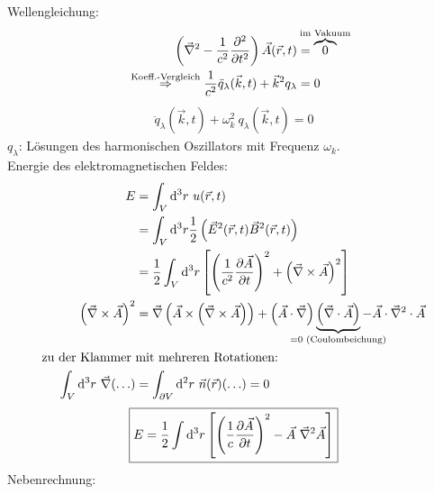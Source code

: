 	Wellengleichung: 
		\begin{align*}
			\left(
				\vec{\nabla}^2 - \frac{1}{c^2} \frac{\partial^2}{\partial t^2} 
			\right)
			\vec{A} (\vec{r} , t) &= \overbrace{0}^{\mathclap{\text{im Vakuum}}} \\
			\overset{\text{Koeff.-Vergleich}}{\Rightarrow} 
			\frac{1}{c^2} \ddot{q}_\lambda (\vec{k} , t) + \vec{k}^2 q_\lambda &= 0
		\end{align*}
		\begin{align*}
			\boxed{\ddot{q}_\lambda (\vec{k} , t) + \omega_k^2 ~q_\lambda (\vec{k} , t)} = 0
		\end{align*}
	$q_\lambda$: Lösungen des harmonischen Oszillators mit Frequenz $\omega_k$. \\
	Energie des elektromagnetischen Feldes: 
		\begin{align*}
			E &= \int_V \diff^3 r ~u (\vec{r} , t) \\
			&= \int_V \diff^3 r \frac{1}{2} \left( \vec{E}^2 (\vec{r} , t) \vec{B}^2 (\vec{r} , t)
			\right) \\
			&= \frac{1}{2} \int_V \diff^3 r \left[
				\left(\frac{1}{c^2} \frac{\partial \vec{A}}{\partial t}\right)^2
				+ \left( \vec{\nabla} \times \vec{A}\right)^2
			\right] \\
			\left( \vec{\nabla} \times \vec{A}\right)^2 &=
			\vec{\nabla} \left(\vec{A} \times \left( \vec{\nabla} \times \vec{A} \right)\right)
			+ \left(\vec{A} \cdot \vec{\nabla}\right) 
			\underbrace{\left( \vec{\nabla} \cdot \vec{A}\right)}_{\mathclap{=0 \text{~(Coulombeichung)}}}
			- \vec{A} \cdot \vec{\nabla}^2 \cdot \vec{A} \\
			\text{zu der Klammer~} &\text{mit mehreren Rotationen:~} \\
			\int_V \diff^3 r~ \vec{\nabla} (\ldots) 
			&= \int_{\partial V} \diff^2 r~ \vec{n} (\vec{r}) (\ldots) = 0
		\end{align*}
		\begin{align*}
			\boxed{
				E = \frac{1}{2} \int \mathrm{d}^3 r \left[ 
				\left(\frac{1}{c} \frac{\partial \vec{A}}{\partial t}\right)^2
				- \vec{A}~ \vec{\nabla}^2 \vec{A}
				\right]	
			}
		\end{align*}
	Nebenrechnung:
